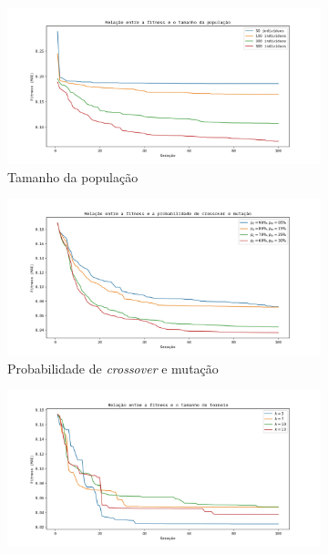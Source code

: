 \documentclass[a4paper]{article}
\begin{document}
\begin{figure}[h]
  \caption{Resultados da \textit{fitness}}
  \label{fig:sr_div_fitness}
  \begin{subfigure}[t]{0.5\textwidth}
      \includegraphics[width=\textwidth]{sr_div_pop_sz}
      \caption{Tamanho da população}
      \label{fig:sr_div_pop_sz}
    \end{subfigure}
    \begin{subfigure}[t]{0.5\textwidth}
      \includegraphics[width=\textwidth]{sr_div_pc_pm}
      \caption{Probabilidade de \textit{crossover} e mutação}
      \label{fig:sr_div_pc_pm}
    \end{subfigure}
    \begin{subfigure}[t]{0.5\textwidth}
      \includegraphics[width=\textwidth]{sr_div_k}

\end{subfigure}
\end{figure}
\end{document}

